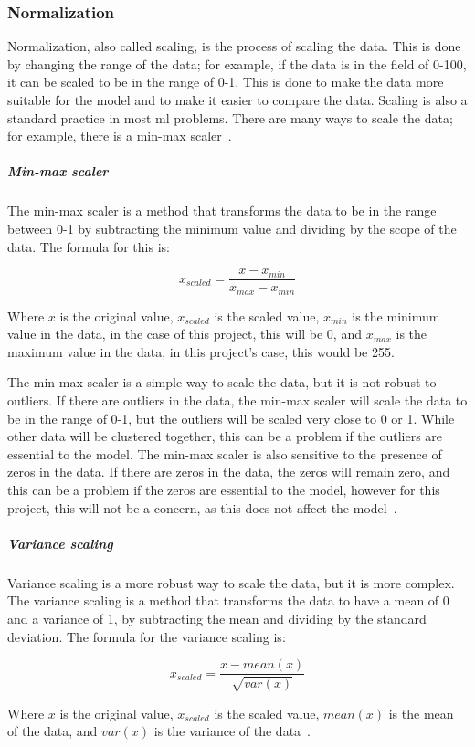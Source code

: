 \subsubsection{Normalization}\label{sec:normalization}
Normalization, also called scaling, is the process of scaling the data. This is done by changing the range of the data; for example, if the data is in the field of 0-100, it can be scaled to be in the range of 0-1. This is done to make the data more suitable for the model and to make it easier to compare the data. Scaling is also a standard practice in most \gls{ml} problems. There are many ways to scale the data; for example, there is a min-max scaler~\cite{Feature-engineering-zheng}.

  
\subparagraph{Min-max scaler}\label{subsec:min-max}
The min-max scaler is a method that transforms the data to be in the range between 0-1 by subtracting the minimum value and dividing by the scope of the data. The formula for this is:

\begin{equation}
    x_{scaled} = \frac{x - x_{min}}{x_{max} - x_{min}}
\end{equation}

Where $x$ is the original value, $x_{scaled}$ is the scaled value, $x_{min}$ is the minimum value in the data, in the case of this project, this will be 0, and $x_{max}$ is the maximum value in the data, in this project's case, this would be 255.

The min-max scaler is a simple way to scale the data, but it is not robust to outliers. If there are outliers in the data, the min-max scaler will scale the data to be in the range of 0-1, but the outliers will be scaled very close to 0 or 1. While other data will be clustered together, this can be a problem if the outliers are essential to the model. The min-max scaler is also sensitive to the presence of zeros in the data. If there are zeros in the data, the zeros will remain zero, and this can be a problem if the zeros are essential to the model, however for this project, this will not be a concern, as this does not affect the model~\cite{Feature-engineering-zheng}.

\subparagraph{Variance scaling}\label{sec:variance-scaling}
Variance scaling is a more robust way to scale the data, but it is more complex. The variance scaling is a method that transforms the data to have a mean of 0 and a variance of 1, by subtracting the mean and dividing by the standard deviation. The formula for the variance scaling is:

\begin{equation}
    x_{scaled} = \frac{x - mean(x)}{\sqrt{var(x)}}
\end{equation}

Where $x$ is the original value, $x_{scaled}$ is the scaled value, $mean(x)$ is the mean of the data, and $var(x)$ is the variance of the data~\cite{Feature-engineering-zheng}.